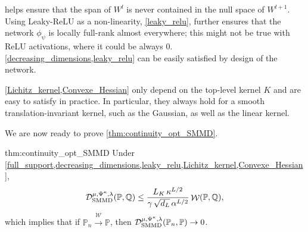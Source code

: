 \documentclass{article}
\newcommand{\wassconv}[1][]{\xrightarrow{{\mathcal W}_{#1}}}
\newcommand{\PP}{\mathbb P}
\newcommand{\QQ}{\mathbb Q}
\DeclareMathOperator{\W}{\mathcal{W}}
\begin{document}
 helps ensure that the span of $W^l$ is never contained in the null space of $W^{l+1}$.
Using Leaky-ReLU as a non-linearity, \cref{leaky_relu},
further ensures that
the network $\phi_\psi$ is locally full-rank almost everywhere;
this might not be true with ReLU activations, where it could be always $0$.
\cref{decreasing_dimensions,leaky_relu} can be easily satisfied by design of the network.


\cref{Lichitz_kernel,Convexe_Hessian} only depend on the top-level kernel $K$ and are easy to satisfy in practice.
In particular, they always hold for a smooth translation-invariant kernel, such as the Gaussian,
as well as the linear kernel.

We are now ready to prove \cref{thm:continuity_opt_SMMD}.

\begin{reptheorem}{thm:continuity_opt_SMMD}
Under \cref{full_support,decreasing_dimensions,leaky_relu,Lichitz_kernel,Convexe_Hessian},
\[
  \optSMMD[\Psi^\kappa](\PP,\QQ) \leq \frac{L_K \, \kappa^{L/2}}{\gamma \, \sqrt{d_L} \, \alpha^{L/2}} \W(\PP, \QQ)
,\]
which implies that if $\PP_n \wassconv \PP$,
then $\optSMMD[\Psi^\kappa](\PP_n, \PP) \to 0$.
\end{reptheorem}
\end{document}
